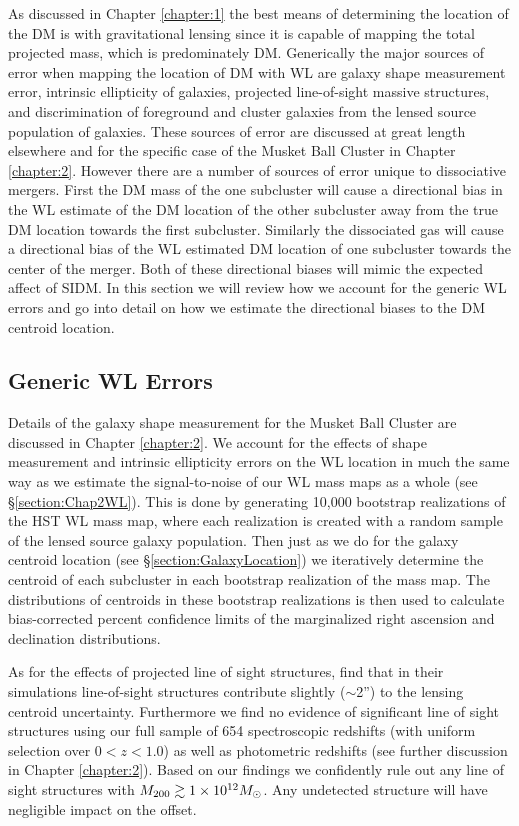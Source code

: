 As discussed in Chapter \ref{chapter:1} the best means of determining the location of the DM is with gravitational lensing since it is capable of mapping the total projected mass, which is predominately DM.
Generically the major sources of error when mapping the location of DM with WL are galaxy shape measurement error, intrinsic ellipticity of galaxies, projected line-of-sight massive structures, and discrimination of foreground and cluster galaxies from the lensed source population of galaxies.
These sources of error are discussed at great length elsewhere \citep[see e.g.][]{Schneider:2006tp, Dietrich:2011gs} and for the specific case of the Musket Ball Cluster in Chapter \ref{chapter:2}.
However there are a number of sources of error unique to dissociative mergers.
First the DM mass of the one subcluster will cause a directional bias in the WL estimate of the DM location of the other subcluster away from the true DM location towards the first subcluster.
Similarly the dissociated gas will cause a directional bias of the WL estimated DM location of one subcluster towards the center of the merger.
Both of these directional biases will mimic the expected affect of SIDM.
In this section we will review how we account for the generic WL errors and go into detail on how we estimate the directional biases to the DM centroid location.

\subsection{Generic WL Errors}

Details of the galaxy shape measurement for the Musket Ball Cluster are discussed in Chapter \ref{chapter:2}.
We account for the effects of shape measurement and intrinsic ellipticity errors on the WL location in much the same way as we estimate the signal-to-noise of our WL mass maps as a whole (see \S\ref{section:Chap2WL}).
This is done by generating 10,000 bootstrap realizations of the HST WL mass map, where each realization is created with a random sample of the lensed source galaxy population.
Then just as we do for the galaxy centroid location (see \S\ref{section:GalaxyLocation}) we iteratively determine the centroid of each subcluster in each bootstrap realization of the mass map.
The distributions of centroids in these bootstrap realizations is then used to  calculate bias-corrected percent confidence limits \citep{Beers:1990kg} of the marginalized right ascension and declination distributions.

As for the effects of projected line of sight structures, \citet{Dietrich:2011gs} find that in their simulations line-of-sight structures contribute slightly ($\sim$2'') to the lensing centroid uncertainty.
Furthermore we find no evidence of significant line of sight structures using our full sample of 654 spectroscopic redshifts (with uniform selection over $0<z<1.0$) as well as photometric redshifts (see further discussion in Chapter \ref{chapter:2}). 
Based on our findings we confidently rule out any line of sight structures with $M_{\rm 200}\gtrsim1\times10^{12} M_\odot$.
Any undetected structure will have negligible impact on the offset.

